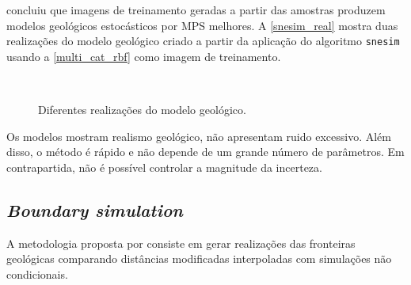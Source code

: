  concluiu que imagens de treinamento geradas a partir das amostras produzem modelos geológicos estocásticos por MPS melhores. A \autoref{snesim_real} mostra duas realizações do modelo geológico criado a partir da aplicação do algoritmo \verb|snesim| usando a \autoref{multi_cat_rbf} como imagem de treinamento. 

\begin{figure}[t]
\caption{Diferentes realizações do modelo geológico.} 
\label{snesim_real}
\begin{center}
\\
\end{center}
\begin{center}
\end{center}
\end{figure}

Os modelos mostram realismo geológico, não apresentam ruido excessivo. Além disso, o método é rápido e não depende de um grande número de parâmetros. Em contrapartida, não é possível controlar a magnitude da incerteza. 

\subsection{\textit{Boundary simulation}}\label{boundsim}

A metodologia proposta por  consiste em gerar realizações das fronteiras geológicas comparando distâncias modificadas interpoladas com simulações não condicionais. 

